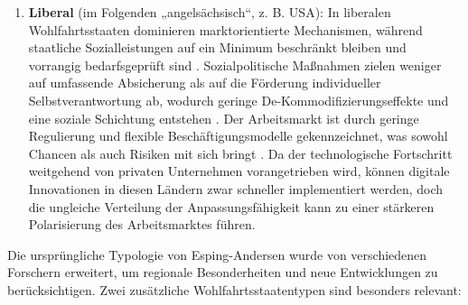 \begin{enumerate}
    \item \textbf{Liberal} (im Folgenden „angelsächsisch“, z. B. USA): In liberalen 
    Wohlfahrtsstaaten dominieren marktorientierte Mechanismen, während staatliche 
    Sozialleistungen auf ein Minimum beschränkt bleiben und vorrangig bedarfsgeprüft sind 
    \parencite[vgl.][S. 26–27]{espingandersen1990thethree}. Sozialpolitische Maßnahmen zielen 
    weniger auf umfassende Absicherung als auf die Förderung individueller Selbstverantwortung 
    ab, wodurch geringe De-Kommodifizierungseffekte und eine soziale Schichtung entstehen 
    \parencite[vgl.][S. 27]{espingandersen1990thethree}. Der Arbeitsmarkt ist durch geringe 
    Regulierung und flexible Beschäftigungsmodelle gekennzeichnet, was sowohl Chancen als auch 
    Risiken mit sich bringt \parencite[vgl.][S. 28–30]{hall2001varieties}. Da der technologische 
    Fortschritt weitgehend von privaten Unternehmen vorangetrieben wird, können digitale 
    Innovationen in diesen Ländern zwar schneller implementiert werden, doch die ungleiche 
    Verteilung der Anpassungsfähigkeit kann zu einer stärkeren Polarisierung des 
    Arbeitsmarktes führen.

\end{enumerate}

Die ursprüngliche Typologie von Esping-Andersen wurde von verschiedenen Forschern erweitert, um 
regionale Besonderheiten und neue Entwicklungen zu berücksichtigen. Zwei zusätzliche 
Wohlfahrtsstaatentypen sind besonders relevant:

